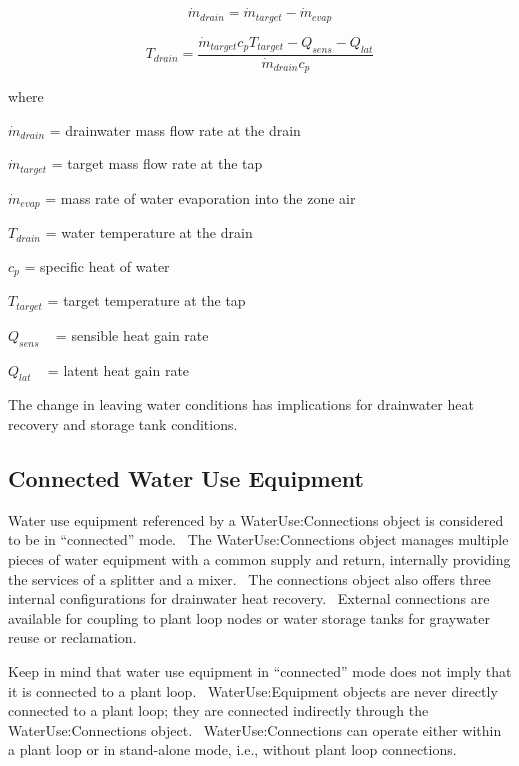 \begin{equation}
{\dot m_{drain}} = {\dot m_{target}} - {\dot m_{evap}}
\end{equation}

\begin{equation}
{T_{drain}} = \frac{{{{\dot m}_{target}}{c_p}{T_{target}} - {Q_{sens}} - {Q_{lat}}}}{{{{\dot m}_{drain}}{c_p}}}
\end{equation}

where

\({\dot m_{drain}}\) = drainwater mass flow rate at the drain

\({\dot m_{target}}\) = target mass flow rate at the tap

\({\dot m_{evap}}\) = mass rate of water evaporation into the zone air

\({T_{drain}}\) = water temperature at the drain

\({c_p}\) = specific heat of water

\({T_{target}}\) = target temperature at the tap

\({Q_{sens}}\) ~ = sensible heat gain rate

\({Q_{lat}}\) ~ = latent heat gain rate

The change in leaving water conditions has implications for drainwater heat recovery and storage tank conditions.

\subsection{Connected Water Use Equipment}\label{connected-water-use-equipment}

Water use equipment referenced by a WaterUse:Connections object is considered to be in ``connected'' mode.~ The WaterUse:Connections object manages multiple pieces of water equipment with a common supply and return, internally providing the services of a splitter and a mixer.~ The connections object also offers three internal configurations for drainwater heat recovery.~ External connections are available for coupling to plant loop nodes or water storage tanks for graywater reuse or reclamation.

Keep in mind that water use equipment in ``connected'' mode does not imply that it is connected to a plant loop.~ WaterUse:Equipment objects are never directly connected to a plant loop; they are connected indirectly through the WaterUse:Connections object.~ WaterUse:Connections can operate either within a plant loop or in stand-alone mode, i.e., without plant loop connections.

